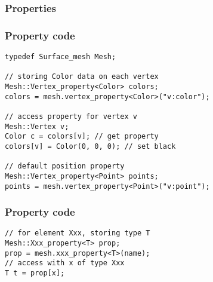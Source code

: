 
\begin{frame}
\end{frame}

\begin{frame}
\frametitle{Properties}
\end{frame}

\begin{frame}[fragile]
\frametitle{Property code}
\lstset{ numbers=none, xleftmargin=0cm }
\begin{lstlisting}
typedef Surface_mesh Mesh;

// storing Color data on each vertex
Mesh::Vertex_property<Color> colors;
colors = mesh.vertex_property<Color>("v:color");

// access property for vertex v
Mesh::Vertex v;
Color c = colors[v]; // get property
colors[v] = Color(0, 0, 0); // set black

// default position property
Mesh::Vertex_property<Point> points;
points = mesh.vertex_property<Point>("v:point");
\end{lstlisting}
\end{frame}

\begin{frame}[fragile]
\frametitle{Property code}
\begin{lstlisting}
// for element Xxx, storing type T
Mesh::Xxx_property<T> prop;
prop = mesh.xxx_property<T>(name);
// access with x of type Xxx
T t = prop[x];
\end{lstlisting}
\end{frame}

